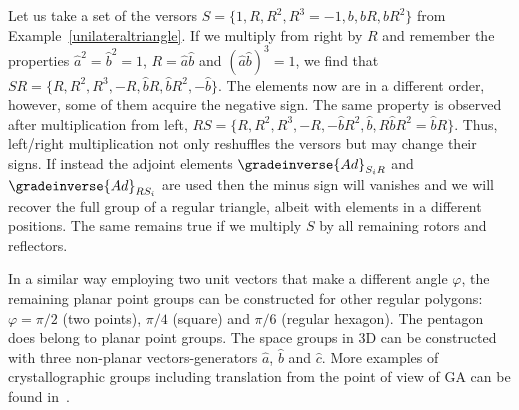 %
\begin{example}   Let us take a set of the versors
$S=\{1,R,R^2,R^3=-1,b,bR,bR^2\}$ from
Example~\ref{unilateraltriangle}. If we multiply from right by $R$
and remember the properties $\hat{a}^2=\hat{b}^2=1$,
$R=\hat{a}\hat{b}$ and $(\hat{a}\hat{b})^3=1$, we find that
$SR=\{R,R^2,R^3,-R,\hat{b}R,\hat{b}R^2,-\hat{b}\}$. The elements
now are in a different order, however, some of them acquire the
negative sign.  The same property is observed after multiplication
from left,
$RS=\{R,R^2,R^3,-R,-\hat{b}R^2,\hat{b},R\hat{b}R^2=\hat{b}R\}$.
Thus, left/right multiplication not only reshuffles the versors
but may change their signs. If instead the adjoint elements
$\gradeinverse{Ad}_{S_iR}$  and $\gradeinverse{Ad}_{RS_i}$   are
used then the minus sign will vanishes and we will recover the
full group of a regular triangle, albeit with elements in a
different positions. The same remains true if we multiply $S$ by
all remaining rotors and reflectors.

In a similar way employing two unit vectors that make a different
angle $\varphi$, the remaining planar point groups can be
constructed for other regular polygons:  $\varphi=\pi/2$ (two
points), $\pi/4$ (square) and $\pi/6$ (regular hexagon). The
pentagon does belong to planar point groups. The space groups in
3D can be constructed with three non-planar vectors-generators
$\hat{a}$, $\hat{b}$ and $\hat{c}$. More examples of
crystallographic groups including translation from the point of
view of GA can be found in~\cite{Hestenes07,Hitzer13}.
\end{example}

